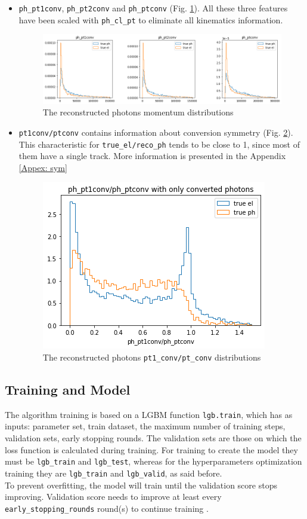 \documentclass[a4paper, oneside, 11pt, openright]{book}
\begin{document}
\begin{itemize}
						\item \texttt{ph\_pt1conv}, \texttt{ph\_pt2conv} and \texttt{ph\_ptconv} (Fig. \ref{fig: ph_pts}). All these three features have been scaled with \texttt{ph\_cl\_pt} to eliminate all kinematics information. 
						
						\begin{figure}[h!]	
							\centering
							\includegraphics[width=1.\linewidth]{tesi_images/ph_pts.png} 
							\caption{The reconstructed photons momentum distributions} 
							\label{fig: ph_pts}
						\end{figure}
						
						\item \texttt{pt1conv/ptconv} contains information about conversion symmetry (Fig. \ref{fig: pt1_pt}). This characteristic for \texttt{true\_el/reco\_ph} tends to be close to 1, since most of them have a single track. More information is presented in the Appendix \ref{Appex: sym}
						
						\begin{figure}[h!]	
							\centering
							\includegraphics[width=.5\linewidth]{tesi_images/pt1_pt.png} 
							\caption{The reconstructed photons \texttt{pt1\_conv/pt\_conv} distributions} 
							\label{fig: pt1_pt}
						\end{figure}
					\end{itemize}
			\subsection{Training and Model}
			The algorithm training is based on a LGBM function \texttt{lgb.train}, which has as inputs: parameter set, train dataset, the maximum number of training steps, validation sets,  early stopping rounds. The validation sets are those on which the loss function is calculated during training. For training to create the model they must be \texttt{lgb\_train} and \texttt{lgb\_test}, whereas for the hyperparameters optimization training they are \texttt{lgb\_train} and \texttt{lgb\_valid}, as said before. \\
			To prevent overfitting, the model will train until the validation score stops improving. Validation score needs to improve at least every \texttt{early\_stopping\_rounds} round(s) to continue training \cite{LGBM}.
			
\end{document}
